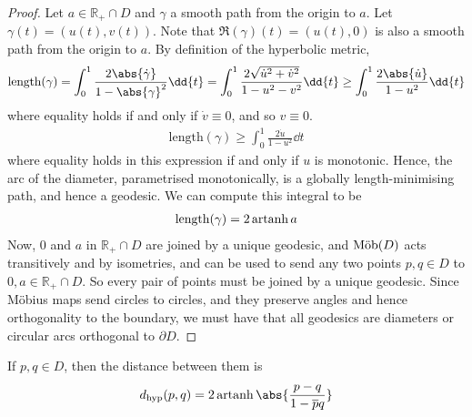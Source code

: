 \begin{proof}
	Let $a \in \mathbb R_+ \cap D$ and $\gamma$ a smooth path from the origin to $a$.
	Let $\gamma(t) = (u(t),v(t))$.
	Note that $\Re(\gamma)(t) = (u(t),0)$ is also a smooth path from the origin to $a$.
	By definition of the hyperbolic metric,
	\begin{align*}
		\mathrm{length}(\gamma) = \int_0^1 \frac{2\abs{\dot \gamma}}{1 - \abs{\gamma}^2} \dd{t} = \int_0^1 \frac{2\sqrt{\dot u^2 + \dot v^2}}{1-u^2 - v^2} \dd{t} \geq \int_0^1 \frac{2 \abs{\dot u}}{1-u^2} \dd{t}
	\end{align*}
	where equality holds if and only if $\dot v \equiv 0$, and so $v \equiv 0$.
	\begin{align*}
		\mathrm{length}(\gamma) \geq \int_0^1 \frac{2 \dot u}{1-u^2} \dd{t}
	\end{align*}
	where equality holds in this expression if and only if $u$ is monotonic.
	Hence, the arc of the diameter, parametrised monotonically, is a globally length-minimising path, and hence a geodesic.
	We can compute this integral to be
	\begin{align*}
		\mathrm{length}(\gamma) = 2\operatorname{artanh} a
	\end{align*}
	Now, $0$ and $a$ in $\mathbb R_+ \cap D$ are joined by a unique geodesic, and $\text{M\"ob}(D)$ acts transitively and by isometries, and can be used to send any two points $p,q \in D$ to $0,a \in \mathbb R_+ \cap D$.
	So every pair of points must be joined by a unique geodesic.
	Since M\"obius maps send circles to circles, and they preserve angles and hence orthogonality to the boundary, we must have that all geodesics are diameters or circular arcs orthogonal to $\partial D$.
\end{proof}
\begin{corollary}
	If $p, q \in D$, then the distance between them is
	\begin{align*}
		d_{\text{hyp}}(p,q) = 2 \artanh \abs{\frac{p-q}{1-\overline p q}}
	\end{align*}
\end{corollary}

